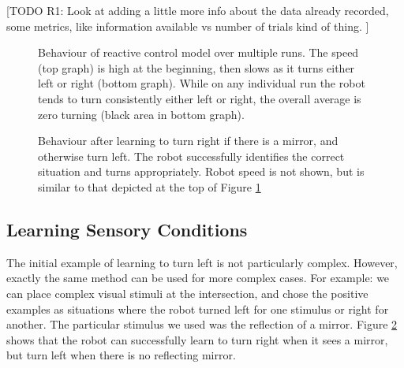 \documentclass[conference]{IEEEtran}
\begin{document}
[TODO R1: Look at adding a little more info about the data already recorded, some metrics, like information available vs number of trials kind of thing. ]

\begin{figure}[!t]
\centering
\caption{Behaviour of reactive control model over multiple runs. The speed (top graph) is high at the beginning, then slows as it turns either left or right (bottom graph). While on any individual run the robot tends to turn consistently either left or right, the overall average is zero turning (black area in bottom graph).}
\label{Cnt}
\end{figure}


\begin{figure}[!t]
\centering
\caption{Behaviour after learning to turn right if there is a mirror, and otherwise turn left. The robot successfully identifies the correct situation and turns appropriately. Robot speed is not shown, but is similar to that depicted at the top of Figure \ref{Cnt}}
\label{Right}
\end{figure}

\subsection{Learning Sensory Conditions}

The initial example of learning to turn left is not particularly complex. However, exactly the same method can be used for more complex cases. For example: we can place complex visual stimuli at the intersection, and chose
the positive examples as situations where the robot turned left for one stimulus or right for another. The particular stimulus we used was the reflection of a mirror. Figure \ref{Right} shows that the robot can successfully learn to turn right when it sees a mirror, but turn left when there is no reflecting mirror.
\end{document}
